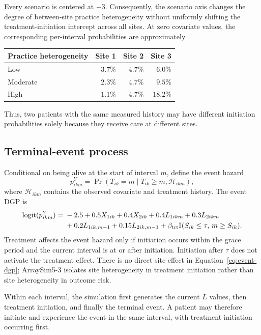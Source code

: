 \documentclass[11pt]{article}
\newcommand{\ind}{\mathbb{I}}
\newcommand{\Prb}{\operatorname{Pr}}
\begin{document}
Every scenario is centered at $-3$. Consequently, the scenario axis changes
the degree of between-site practice heterogeneity without uniformly shifting
the treatment-initiation intercept across all sites. At zero covariate values,
the corresponding per-interval probabilities are approximately
\begin{center}
\begin{tabular}{lrrr}
\toprule
Practice heterogeneity & Site 1 & Site 2 & Site 3 \\
\midrule
Low      & $3.7\%$ & $4.7\%$ & $6.0\%$ \\
Moderate & $2.3\%$ & $4.7\%$ & $9.5\%$ \\
High     & $1.1\%$ & $4.7\%$ & $18.2\%$ \\
\bottomrule
\end{tabular}
\end{center}
Thus, two patients with the same measured history may have different
initiation probabilities solely because they receive care at different sites.

\subsection{Terminal-event process}

Conditional on being alive at the start of interval $m$, define the event
hazard
\[
  p^Y_{ikm}=\Prb(T_{ik}=m\mid T_{ik}\geq m,\mathcal H_{ikm}),
\]
where $\mathcal H_{ikm}$ contains the observed covariate and treatment history.
The event DGP is
\begin{align}
\label{eq:event-dgp}
  \operatorname{logit}(p^Y_{ikm})
  ={}&-2.5
      +0.5X_{1ik}+0.4X_{2ik}
      +0.4L_{1ikm}+0.3L_{2ikm} \notag\\
     &+0.2L_{1ik,m-1}+0.15L_{2ik,m-1}
      +\beta_{\mathrm{trt}}
       \ind(S_{ik}\leq\tau,\,m\geq S_{ik}).
\end{align}
Treatment affects the event hazard only if initiation occurs within the grace
period and the current interval is at or after initiation. Initiation after
$\tau$ does not activate the treatment effect. There is no direct site effect
in Equation~\eqref{eq:event-dgp}; ArraySim5-3 isolates site heterogeneity in
treatment initiation rather than site heterogeneity in outcome risk.

Within each interval, the simulation first generates the current $L$ values,
then treatment initiation, and finally the terminal event. A patient may
therefore initiate and experience the event in the same interval, with
treatment initiation occurring first.
\end{document}
